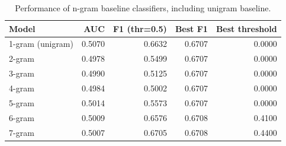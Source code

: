 \begin{table}
\caption{Performance of n-gram baseline classifiers, including unigram baseline.}
\label{tab:ngram_baselines}
\begin{tabular}{lrrrr}
\toprule
Model & AUC & F1 (thr=0.5) & Best F1 & Best threshold \\
\midrule
1-gram (unigram) & 0.5070 & 0.6632 & 0.6707 & 0.0000 \\
2-gram & 0.4978 & 0.5499 & 0.6707 & 0.0000 \\
3-gram & 0.4990 & 0.5125 & 0.6707 & 0.0000 \\
4-gram & 0.4984 & 0.5002 & 0.6707 & 0.0000 \\
5-gram & 0.5014 & 0.5573 & 0.6707 & 0.0000 \\
6-gram & 0.5009 & 0.6576 & 0.6708 & 0.4100 \\
7-gram & 0.5007 & 0.6705 & 0.6708 & 0.4400 \\
\bottomrule
\end{tabular}
\end{table}
